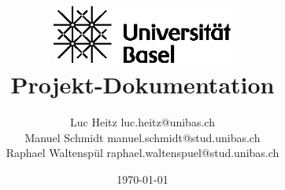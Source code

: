 	\titlehead{30526-01 – Introduction to Internet and Security 
	\
	\hfill  Projekt LoRa}
\title{\includegraphics[width=6cm]{./thm/picLogo.eps}
	\\ \vspace{1em}
	Projekt-Dokumentation}
\author{Luc Heitz \flqq luc.heitz@unibas.ch\frqq \\
	Manuel  Schmidt \flqq manuel.schmidt@stud.unibas.ch\frqq \\
	Raphael Waltenspül \flqq raphael.waltenspuel@stud.unibas.ch
}

\date{\today}
\publishers{
	Universität Basel}
\maketitle

